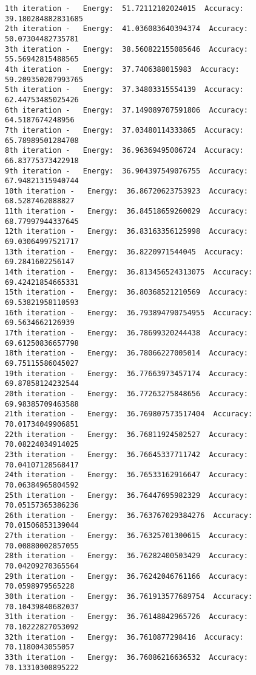 \documentclass[11pt]{article}
\begin{document}
    \begin{Verbatim}[commandchars=\\\{\}]
1th iteration -   Energy:  51.72112102024015  Accuracy:  39.180284882831685
2th iteration -   Energy:  41.036083640394374  Accuracy:  50.07304482735781
3th iteration -   Energy:  38.560822155085646  Accuracy:  55.56942815488565
4th iteration -   Energy:  37.7406388015983  Accuracy:  59.209350207993765
5th iteration -   Energy:  37.34803315554139  Accuracy:  62.44753485025426
6th iteration -   Energy:  37.149089707591806  Accuracy:  64.5187674248956
7th iteration -   Energy:  37.03480114333865  Accuracy:  65.78989501284708
8th iteration -   Energy:  36.96369495006724  Accuracy:  66.83775373422918
9th iteration -   Energy:  36.904397549076755  Accuracy:  67.94821315940744
10th iteration -   Energy:  36.86720623753923  Accuracy:  68.5287462088827
11th iteration -   Energy:  36.84518659260029  Accuracy:  68.77997944337645
12th iteration -   Energy:  36.83163356125998  Accuracy:  69.03064997521717
13th iteration -   Energy:  36.8220971544045  Accuracy:  69.2841602256147
14th iteration -   Energy:  36.813456524313075  Accuracy:  69.42421854665331
15th iteration -   Energy:  36.80368521210569  Accuracy:  69.53821958110593
16th iteration -   Energy:  36.793894790754955  Accuracy:  69.5634662126939
17th iteration -   Energy:  36.78699320244438  Accuracy:  69.61250836657798
18th iteration -   Energy:  36.78066227005014  Accuracy:  69.75115586045027
19th iteration -   Energy:  36.77663973457174  Accuracy:  69.87858124232544
20th iteration -   Energy:  36.77263275848656  Accuracy:  69.98385709463588
21th iteration -   Energy:  36.769807573517404  Accuracy:  70.01734049906851
22th iteration -   Energy:  36.76811924502527  Accuracy:  70.08224034914025
23th iteration -   Energy:  36.76645337711742  Accuracy:  70.04107128568417
24th iteration -   Energy:  36.76533162916647  Accuracy:  70.06384965804592
25th iteration -   Energy:  36.76447695982329  Accuracy:  70.05157365386236
26th iteration -   Energy:  36.763767029384276  Accuracy:  70.01506853139044
27th iteration -   Energy:  36.76325701300615  Accuracy:  70.00880002857055
28th iteration -   Energy:  36.76282400503429  Accuracy:  70.04209270365564
29th iteration -   Energy:  36.76242046761166  Accuracy:  70.0598979565228
30th iteration -   Energy:  36.761913577689754  Accuracy:  70.10439840682037
31th iteration -   Energy:  36.76148842965726  Accuracy:  70.10222827053092
32th iteration -   Energy:  36.7610877298416  Accuracy:  70.1180043055057
33th iteration -   Energy:  36.76086216636532  Accuracy:  70.13310300895222

\end{Verbatim}
\end{document}
